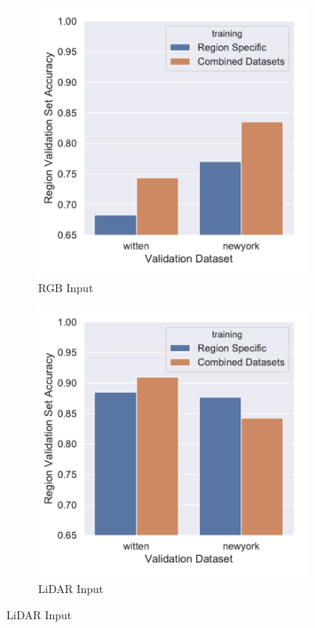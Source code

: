 \begin{figure}[h]
    \centering
    \begin{subfigure}[t]{0.45\columnwidth}
        \centering
        \includegraphics[width=0.99\textwidth]{chapter_4_roofshape/imgs/multi_data_set_rgb.pdf}
        \caption{RGB Input}
        \label{fig:rgb_multi_data}
    \end{subfigure}
    \hfill
    \begin{subfigure}[t]{0.45\columnwidth}
        \centering
        \includegraphics[width=0.99\textwidth]{chapter_4_roofshape/imgs/multi_data_set_lidar.pdf}
        \caption{LiDAR Input}
        \label{fig:lidar_multi_data}
    \end{subfigure}
    \vspace{-12pt}


\end{figure}

